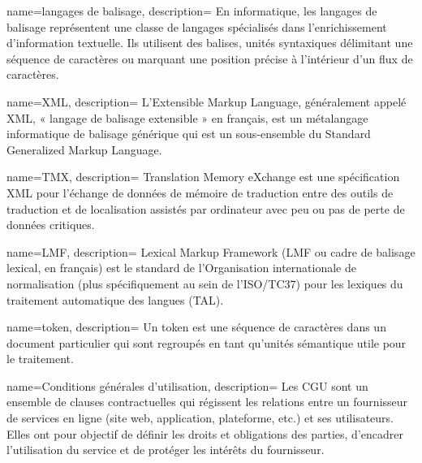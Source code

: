 {
    name=langages de balisage,
    description={
    En informatique, les langages de balisage représentent une classe de langages spécialisés dans l'enrichissement d'information textuelle. Ils utilisent des balises, unités syntaxiques délimitant une séquence de caractères ou marquant une position précise à l'intérieur d'un flux de caractères.
    }
}

{
    name=XML,
    description={
    L'Extensible Markup Language, généralement appelé XML, « langage de balisage extensible » en français, est un métalangage informatique de balisage générique qui est un sous-ensemble du Standard Generalized Markup Language. 
    }
}


{
    name=TMX,
    description={
    Translation Memory eXchange est une spécification XML pour l'échange de données de mémoire de traduction entre des outils de traduction et de localisation assistés par ordinateur avec peu ou pas de perte de données critiques.
    }
}

{
    name=LMF,
    description={
    Lexical Markup Framework (LMF ou cadre de balisage lexical, en français) est le standard de l'Organisation internationale de normalisation (plus spécifiquement au sein de l'ISO/TC37) pour les lexiques du traitement automatique des langues (TAL).
    }
}

{
    name=token,
    description={
    Un token est une séquence de caractères dans un document particulier qui sont regroupés en tant qu'unités sémantique utile pour le traitement.
    }
}

{
    name=Conditions générales d'utilisation,
    description={
    Les CGU sont un ensemble de clauses contractuelles qui régissent les relations entre un fournisseur de services en ligne (site web, application, plateforme, etc.) et ses utilisateurs. Elles ont pour objectif de définir les droits et obligations des parties, d’encadrer l’utilisation du service et de protéger les intérêts du fournisseur.
    }
}